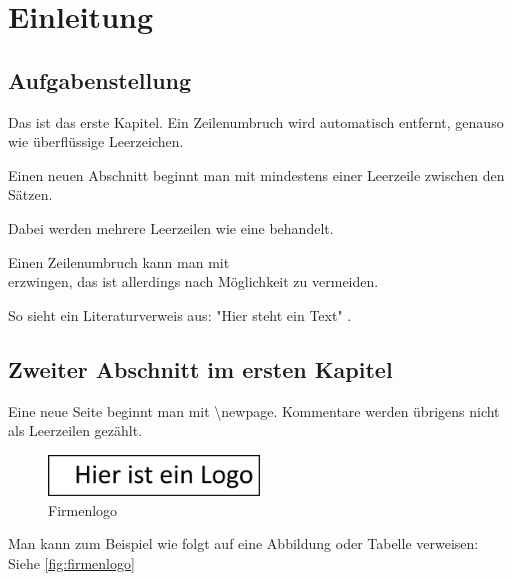 \chapter{Einleitung}        %
\section{Aufgabenstellung}  %
Das ist das erste Kapitel.
Ein Zeilenumbruch wird automatisch entfernt, genauso    wie   überflüssige                 Leerzeichen.

Einen neuen Abschnitt beginnt man mit mindestens einer Leerzeile zwischen den Sätzen.




Dabei werden mehrere Leerzeilen wie eine behandelt.

Einen Zeilenumbruch kann man mit \\ erzwingen, das ist allerdings nach Möglichkeit zu vermeiden.

So sieht ein Literaturverweis aus: "Hier steht ein Text" \cite{OPCFoundation}.
\newpage
\section{Zweiter Abschnitt im ersten Kapitel}
Eine neue Seite beginnt man mit \textbackslash newpage.
Kommentare werden übrigens nicht als Leerzeilen gezählt.

\begin{figure}[h]                                               %
    \includegraphics[width=0.5\textwidth]{content/img/company.png}        %
    \caption{Firmenlogo}                                        %
    \label{fig:firmenlogo}                                      %
\end{figure}

Man kann zum Beispiel wie folgt auf eine Abbildung oder Tabelle verweisen: Siehe \autoref{fig:firmenlogo}

